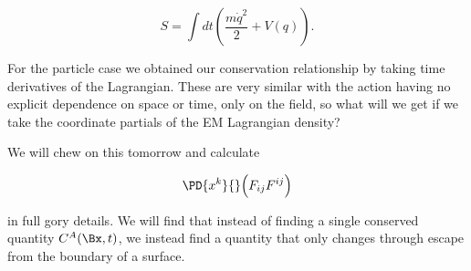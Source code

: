 \begin{equation}\label{eqn:relativisticElectrodynamicsL21b:520}
S = \int dt \left( \frac{m \dot{q}^2}{2} + V(q) \right).
\end{equation}

For the particle case we obtained our conservation relationship by taking time derivatives of the Lagrangian.  These are very similar with the action having no explicit dependence on space or time, only on the field, so what will we get if we take the coordinate partials of the EM Lagrangian density?

We will chew on this tomorrow and calculate 

\begin{equation}\label{eqn:relativisticElectrodynamicsL21b:540}
\PD{x^k}{} \Bigl( F_{i j} F^{i j} \Bigr)
\end{equation}

in full gory details.  We will find that instead of finding a single conserved quantity \(C^A(\Bx, t)\), we instead find a quantity that only changes through escape from the boundary of a surface.
